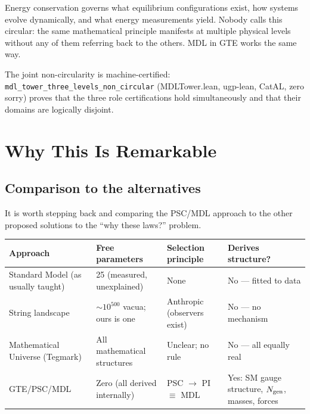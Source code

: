 \documentclass[11pt,a4paper]{article}
\newcommand{\lean}[1]{\texttt{#1}}
\begin{document}
\begin{tcolorbox}[colback=boxblue,colframe=blue!40!black,
  title=Analogy: energy conservation]
Energy conservation governs what equilibrium configurations exist, how systems evolve
dynamically, and what energy measurements yield.  Nobody calls this circular: the same
mathematical principle manifests at multiple physical levels without any of them
referring back to the others.  MDL in GTE works the same way.
\end{tcolorbox}

The joint non-circularity is machine-certified: \lean{mdl\_tower\_three\_levels\_non\_circular}
(MDLTower.lean, ugp-lean, CatAL, zero sorry) proves that the three role certifications
hold simultaneously and that their domains are logically disjoint.

\section{Why This Is Remarkable}
\label{sec:remarkable}

\subsection{Comparison to the alternatives}

It is worth stepping back and comparing the PSC/MDL approach to the other proposed
solutions to the ``why these laws?'' problem.

\bigskip
{\setlength{\emergencystretch}{5em}\small\sloppy
\noindent\begin{tabularx}{\textwidth}{@{}p{2.6cm}p{3.2cm}p{3.2cm}X@{}}
\toprule
\textbf{Approach} & \textbf{Free parameters} & \textbf{Selection principle} & \textbf{Derives structure?} \\
\midrule
Standard Model (as usually taught)
  & 25 (measured, unexplained)
  & None
  & No — fitted to data \\[4pt]
String landscape
  & $\sim10^{500}$ vacua; ours is one
  & Anthropic (observers exist)
  & No — no mechanism \\[4pt]
Mathematical Universe (Tegmark)
  & All mathematical structures
  & Unclear; no rule
  & No — all equally real \\[4pt]
GTE/PSC/MDL
  & Zero (all derived internally)
  & PSC $\to$ PI $\equiv$ MDL
  & Yes: SM gauge structure, $N_{\rm gen}$, masses, forces \\
\bottomrule
\end{tabularx}
}
\end{document}
